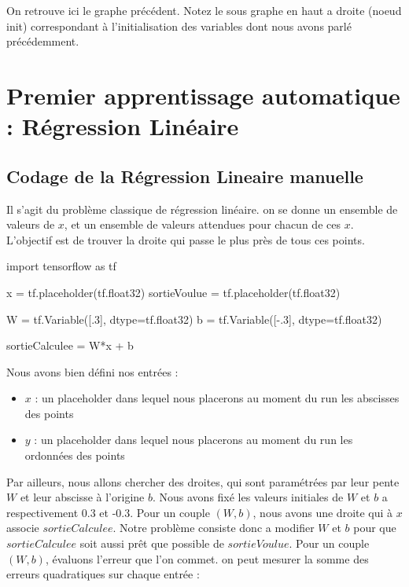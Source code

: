 \documentclass[a4paper,11pt]{book}
\theoremstyle{theo}
\begin{document}
On retrouve ici le graphe précédent. Notez le sous graphe en haut a droite (noeud init) correspondant à l'initialisation des variables dont nous avons parlé précédemment. 

\chapter{Premier apprentissage automatique : Régression Linéaire}

\section{Codage de la Régression Lineaire manuelle}
Il s'agit du problème classique de régression linéaire. on se donne un ensemble de valeurs de $x$, et un ensemble de valeurs attendues pour chacun de ces $x$. L'objectif est de trouver la droite qui passe le plus près de tous ces points.
\begin{mypython}
import tensorflow as tf

x = tf.placeholder(tf.float32)
sortieVoulue = tf.placeholder(tf.float32)

W = tf.Variable([.3], dtype=tf.float32)
b = tf.Variable([-.3], dtype=tf.float32)

sortieCalculee = W*x + b
\end{mypython}
Nous avons bien défini nos entrées :
\begin{itemize}
\item $x$ : un placeholder dans lequel nous placerons au moment du run les abscisses des points
\item $y$ : un placeholder dans lequel nous placerons au moment du run les ordonnées des points
\end{itemize}

Par ailleurs, nous allons chercher des droites, qui sont paramétrées par leur pente $W$ et leur abscisse à l'origine $b$. Nous avons fixé les valeurs initiales de $W$ et $b$ a respectivement 0.3 et -0.3. Pour un couple $(W,b)$, nous avons une droite qui à $x$ associe $sortieCalculee$.
Notre problème consiste donc a modifier $W$ et $b$ pour que $sortieCalculee$ soit aussi prêt que possible de $sortieVoulue$.
Pour un couple $(W,b)$, évaluons l'erreur que l'on commet. on peut mesurer la somme des erreurs quadratiques sur chaque entrée :
\end{document}
